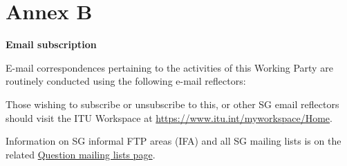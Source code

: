
\clearpage
\section*{Annex B}\label{annex-b}

\begin{center}
\textbf{Email subscription}
\end{center}



E-mail correspondences pertaining to the activities of this Working Party are routinely conducted using the following e-mail reflectors:

\wpReflectorList

Those wishing to subscribe or unsubscribe to this, or other SG\studyGroup{} email reflectors should visit the ITU Workspace at \href{https://www.itu.int/myworkspace/Home}{https://www.itu.int/myworkspace/Home}.

Information on SG\studyGroup{} informal FTP areas (IFA) and all SG\studyGroup{} mailing lists is on the related \href{https://www.itu.int/en/ITU-T/studygroups/2025-2028/17/Pages/q-mailing-lists.aspx}{Question mailing lists page}.
